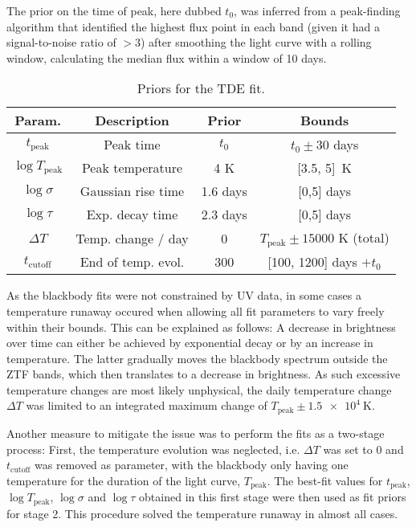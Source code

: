 The prior on the time of peak, here dubbed $t_0$, was inferred from a peak-finding algorithm that identified the highest flux point in each band (given it had a signal-to-noise ratio of $>3$) after smoothing the light curve with a rolling window, calculating the median flux within a window of 10 days.

\begin{table}[h]
  \begin{center}
    \begin{tabular}{c c c c}
      \hline
      \textbf{Param.}      & \textbf{Description} & \textbf{Prior} & \textbf{Bounds}                     \\
      \hline
      \hline
      $t_\text{peak}$      & Peak time            & $t_0$          & $t­_0 \pm 30$ days                  \\
      $\log T_\text{peak}$ & Peak temperature     & 4 K            & [3.5, 5]~\unit{\K}                  \\
      $\log \sigma$        & Gaussian rise time   & 1.6 days       & [0,5] days                          \\
      $\log \tau$          & Exp. decay time      & 2.3 days       & [0,5] days                          \\
      $\Delta T$           & Temp. change / day   & 0              & $T_\text{peak} \pm 15000$ K (total) \\
      $t_\text{cutoff}$    & End of temp. evol.   & 300            & [100, 1200] days $+t_0$             \\
      \hline
    \end{tabular}
  \end{center}
  \caption[TDE Fit priors]{Priors for the TDE fit.}\label{tab:tde_fit_priors}
\end{table}

As the blackbody fits were not constrained by UV data, in some cases a temperature runaway occured when allowing all fit parameters to vary freely within their bounds. This can be explained as follows: A decrease in brightness over time can either be achieved by exponential decay or by an increase in temperature. The latter gradually moves the blackbody spectrum outside the ZTF bands, which then translates to a decrease in brightness. As such excessive temperature changes are most likely unphysical, the daily temperature change $\Delta T$ was limited to an integrated maximum change of $T_\text{peak} \pm \SI{1.5e4}{\K}$.

Another measure to mitigate the issue was to perform the fits as a two-stage process: First, the temperature evolution was neglected, i.e. $\Delta T$ was set to $0$ and $t_\text{cutoff}$ was removed as parameter, with the blackbody only having one temperature for the duration of the light curve, $T_\text{peak}$. The best-fit values for $t_\text{peak}$, $\log T_\text{peak}$, $\log \sigma$ and $\log \tau$ obtained in this first stage were then used as fit priors for stage 2. This procedure solved the temperature runaway in almost all cases.

